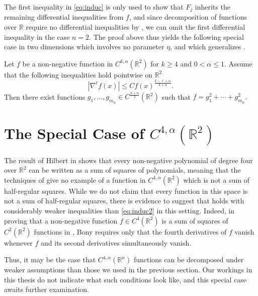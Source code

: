 \documentclass[oneside,hidelinks,indentfirst,10pt]{book}
\begin{document}
The first inequality in \eqref{eq:induc} is only used to show that \(F_j\) inherits the remaining differential inequalities from \(f\), and since decomposition of functions over \(\mathbb{R}\) require no differential inequalities by , we can omit the first differential inequality in the case \(n=2\). The proof above thus yields the following special case in two dimensions which involves no parameter \(\eta\), and which generalizes \cite[Theorem 4.7]{SOS_I}.


\begin{thm}\label{thm:nooooo}
Let \(f\) be a non-negative function in \(C^{k,\alpha}(\mathbb{R}^2)\) for \(k\geq 4\) and \(0<\alpha\leq 1\). Assume that the following inequalities hold pointwise on \(\mathbb{R}^2\)
\begin{equation}\label{eq:induc2}
    |\nabla^\ell f(x)|\leq Cf(x)^\frac{k-\ell+\alpha}{k+\alpha}.
\end{equation}
Then there exist  functions \(g_1,\dots,g_{m_n}\in C^\frac{k+\alpha}{2}(\mathbb{R}^2)\) such that \( f=g_1^2+\cdots+g_{m_n}^2.\)

\end{thm}

\newpage

\section{The Special Case of \texorpdfstring{\(C^{4,\alpha}(\mathbb{R}^2)\)}{}}\label{sec:maybe}


The result of Hilbert in \cite{Hilbert} shows that every non-negative polynomial of degree four over \(\mathbb{R}^2\) can be written as a sum of squares of polynomials, meaning that the techniques of  give no example of a function in \(C^{4,\alpha}(\mathbb{R}^2)\) which is not a sum of half-regular squares. While we do not claim that every function in this space is not a sum of half-regular squares, there is evidence to suggest that  holds with considerably weaker inequalities than \eqref{eq:induc2} in this setting. Indeed, in proving that a non-negative function \(f\in C^{4}(\mathbb{R}^2)\) is a sum of squares of \(C^{2}(\mathbb{R}^2)\) functions in \cite{Bony}, Bony requires only that the fourth derivatives of \(f\) vanish whenever \(f\) and its second derivatives simultaneously vanish. 

Thus, it may be the case that \(C^{4,\alpha}(\mathbb{R}^n)\) functions can be decomposed under weaker assumptions than those we used in the previous section. Our workings in this thesis do not indicate what such conditions look like, and this special case awaits further examination.%
\end{document}
